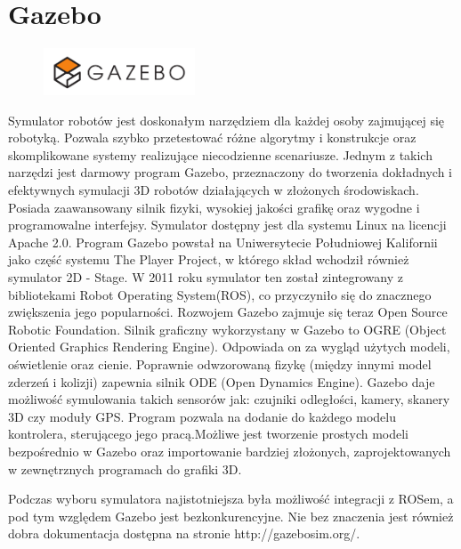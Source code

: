  \section{Gazebo}
  
 \begin{figure}[htbp]
  \centering
  \includegraphics[width=0.4\textwidth]{wykorzystane_narzedzia/materialy/gazebo.jpg}
  \label{fig:blender}
 \end{figure}
 
  Symulator robotów jest doskonałym narzędziem dla każdej osoby zajmującej się robotyką. Pozwala szybko przetestować różne algorytmy i konstrukcje oraz skomplikowane systemy realizujące niecodzienne scenariusze. Jednym z takich narzędzi jest darmowy program Gazebo, przeznaczony do tworzenia dokładnych i efektywnych symulacji 3D robotów działających w złożonych środowiskach. Posiada zaawansowany silnik fizyki, wysokiej jakości grafikę oraz wygodne i programowalne interfejsy. Symulator dostępny jest dla systemu Linux na licencji Apache 2.0.
  Program Gazebo powstał na Uniwersytecie Południowej Kalifornii jako część systemu The Player Project, w którego skład wchodził również symulator 2D - Stage. W 2011 roku symulator ten został zintegrowany z bibliotekami Robot Operating System(ROS), co przyczyniło się do znacznego zwiększenia jego popularności. Rozwojem Gazebo zajmuje się teraz Open Source Robotic Foundation. Silnik graficzny wykorzystany w Gazebo to OGRE (Object Oriented Graphics Rendering Engine). Odpowiada on za wygląd użytych modeli, oświetlenie oraz cienie. Poprawnie odwzorowaną fizykę (między innymi model zderzeń i kolizji) zapewnia silnik ODE (Open Dynamics Engine). Gazebo daje możliwość symulowania takich sensorów jak: czujniki odległości, kamery, skanery 3D czy moduły GPS. Program pozwala na dodanie do każdego modelu kontrolera, sterującego jego pracą.Możliwe jest tworzenie prostych modeli bezpośrednio w Gazebo oraz importowanie bardziej złożonych, zaprojektowanych w zewnętrznych programach do grafiki 3D.
  
Podczas wyboru symulatora najistotniejsza była możliwość integracji z ROSem, a pod tym względem Gazebo jest bezkonkurencyjne. Nie bez znaczenia jest również dobra dokumentacja dostępna na stronie http://gazebosim.org/.
